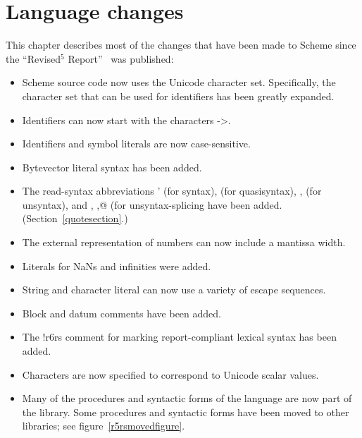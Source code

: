 \chapter{Language changes}

This chapter describes most of the changes that have been made to
Scheme since the ``Revised$^5$ Report''~\cite{R5RS} was published:

\begin{itemize}
\item Scheme source code now uses the Unicode character set.
  Specifically, the character set that can be used for identifiers has
  been greatly expanded.
\item Identifiers can now start with the characters {\cf ->}.
\item Identifiers and symbol literals are now case-sensitive.
\item Bytevector literal syntax has been added.
\item The read-syntax abbreviations {\cf \sharpsign{}'} (for {\cf
    syntax}), {\cf \sharpsign\backquote} (for {\cf quasisyntax}), {\cf
    \sharpsign{},} (for {\cf unsyntax}), and , {\cf \sharpsign{},@}
  (for {\cf unsyntax-splicing} have been added.  (Section~\ref{quotesection}.)
\item The external representation of numbers can now include a
  mantissa width.
\item Literals for NaNs and infinities were added.
\item String and character literal can now use a variety of escape sequences.
\item Block and datum comments have been added.
\item The {\cf !\sharpsign{}r6rs} comment for marking report-compliant
  lexical syntax has been added.
\item Characters are now specified to correspond to Unicode scalar
  values.
\item Many of the procedures and syntactic forms of the language are
  now part of the  library.  Some procedures and
  syntactic forms have been moved to other libraries; see figure~\ref{r5rsmovedfigure}.


\end{itemize}
